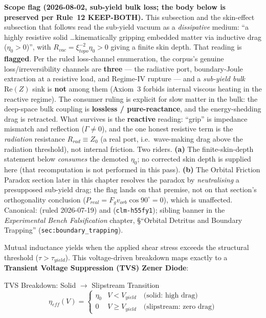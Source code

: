 \noindent\textbf{Scope flag (2026-08-02, sub-yield bulk loss; the body below is preserved per Rule~12 KEEP-BOTH).} This subsection and the skin-effect subsection that follows read the sub-yield vacuum as a \emph{dissipative} medium: ``a highly resistive solid \ldots kinematically gripping embedded matter via inductive drag ($\eta_0 > 0$)'', with $R_{vac} = \xi_{topo}^{-2}\eta_0 > 0$ giving a finite skin depth. That reading is \textbf{flagged}. Per the ruled loss-channel enumeration, the corpus's genuine loss/irreversibility channels are \textbf{three} --- the radiative port, boundary-Joule extraction at a resistive load, and Regime-IV rupture --- and a \emph{sub-yield bulk} $\mathrm{Re}(Z)$ sink is \textbf{not} among them (Axiom~3 forbids internal viscous heating in the reactive regime). The consumer ruling is explicit for slow matter in the bulk: the deep-space bulk coupling is \textbf{lossless / pure-reactance}, and the energy-shedding drag is retracted. What survives is the \textbf{reactive} reading: ``grip'' is impedance mismatch and reflection ($\Gamma \neq 0$), and the one honest resistive term is the \emph{radiation} resistance $R_{rad} \equiv Z_0$ (a real port, i.e.\ wave-making drag above the radiation threshold), not internal friction. Two riders. \textbf{(a)} The finite-skin-depth statement below \emph{consumes} the demoted $\eta_0$; no corrected skin depth is supplied here (that recomputation is not performed in this pass). \textbf{(b)} The Orbital Friction Paradox section later in this chapter resolves the paradox by \emph{neutralising} a presupposed sub-yield drag; the flag lands on that premise, not on that section's orthogonality conclusion ($P_{real} = F_g v_{orb}\cos 90^\circ = 0$), which is unaffected. Canonical:  (ruled 2026-07-19) and  (\texttt{clm-h55fy1}); sibling banner in the \emph{Experimental Bench Falsification} chapter, \S``Orbital Detritus and Boundary Trapping'' (\texttt{sec:boundary\_trapping}).

Mutual inductance yields when the applied shear stress exceeds the structural threshold ($\tau > \tau_{yield}$). This voltage-driven breakdown maps exactly to a \textbf{Transient Voltage Suppression (TVS) Zener Diode}:

\begin{resultbox}{TVS Breakdown: Solid $\to$ Slipstream Transition}
\begin{equation}
    \eta_{eff}(V) = \begin{cases}
        \eta_0 & V < V_{yield} \quad \text{(solid: high drag)} \\[4pt]
        0      & V \geq V_{yield} \quad \text{(slipstream: zero drag)}
    \end{cases}
    \label{eq:tvs_transition}
\end{equation}
\end{resultbox}

